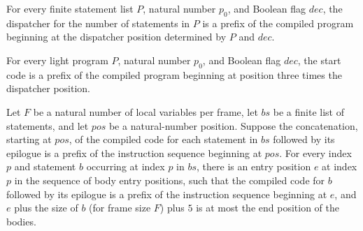 \begin{theorem}
\label{Light.Compiler.codeAt_dispatcher_dispPos}
\leanok
{}
For every finite statement list $P$, natural number $p_0$, and Boolean flag $dec$, the
dispatcher for the number of statements in $P$ is a prefix of the compiled program
beginning at the dispatcher position determined by $P$ and $dec$.
\end{theorem}

\begin{theorem}
\label{Light.Compiler.codeAt_startCode}
\leanok
{}
For every light program $P$, natural number $p_0$, and Boolean flag $dec$, the start
code is a prefix of the compiled program beginning at position three times the
dispatcher position.
\end{theorem}

\begin{theorem}
\label{Light.Compiler.codeAt_bodies}
\leanok
{}
Let $F$ be a natural number of local variables per frame, let $bs$ be a finite list of
statements, and let $pos$ be a natural-number position. Suppose the concatenation,
starting at $pos$, of the compiled code for each statement in $bs$ followed by its
epilogue is a prefix of the instruction sequence beginning at $pos$. For every index $p$
and statement $b$ occurring at index $p$ in $bs$, there is an entry position $e$ at
index $p$ in the sequence of body entry positions, such that the compiled code for $b$
followed by its epilogue is a prefix of the instruction sequence beginning at $e$, and
$e$ plus the size of $b$ (for frame size $F$) plus $5$ is at most the end position of
the bodies.
\end{theorem}
